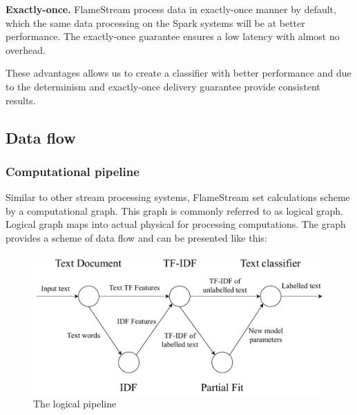 \textbf{Exactly-once.} FlameStream process data in exactly-once manner by default, which the same data processing on the Spark systems will be at better performance. The exactly-once guarantee ensures a low latency with almost no overhead.

These advantages allows us to create a classifier with better performance and due to the determinism and exactly-once delivery guarantee provide consistent results.

\subsection{Data flow}

\subsubsection{Computational pipeline}

Similar to other stream processing systems, FlameStream set calculations scheme by a computational graph. This graph is  commonly referred to as logical graph. Logical graph maps into actual physical for processing computations. The graph provides a scheme of data flow and can be presented like this:

\begin{figure}[htbp]
  \centering
  \includegraphics[scale=0.48]{pics/logical-graph}
  \caption{The logical pipeline}
  \label {logical graph}
\end{figure}

